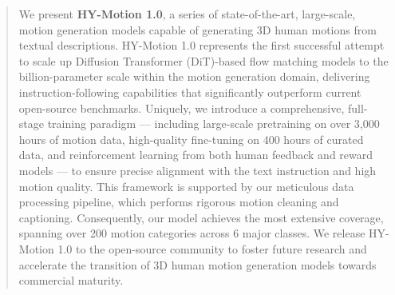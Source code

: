

\begin{abstract}
We present \textbf{HY-Motion 1.0}, a series of state-of-the-art, large-scale, motion generation models capable of generating 3D human motions from textual descriptions. 
HY-Motion 1.0 represents the first successful attempt to scale up Diffusion Transformer (DiT)-based flow matching models to the billion-parameter scale within the motion generation domain, delivering instruction-following capabilities that significantly outperform current open-source benchmarks. 
Uniquely, we introduce a comprehensive, full-stage training paradigm — including large-scale pretraining on over 3,000 hours of motion data, high-quality fine-tuning on 400 hours of curated data, and reinforcement learning from both human feedback and reward models — to ensure precise alignment with the text instruction and high motion quality. 
This framework is supported by our meticulous data processing pipeline, which performs rigorous motion cleaning and captioning. Consequently, our model achieves the most extensive coverage, spanning over 200 motion categories across 6 major classes. 
We release HY-Motion 1.0 to the open-source community to foster future research and accelerate the transition of 3D human motion generation models towards commercial maturity.
\end{abstract}
